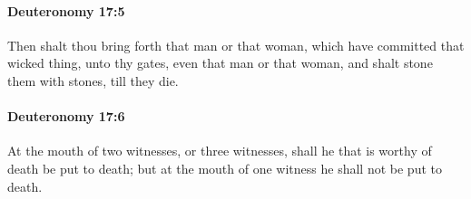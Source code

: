 		\paragraph{Deuteronomy 17:5} %
			\label{DEUTERONOMY-17-5}

			Then shalt thou bring forth that man or that woman, which have committed that wicked thing, unto thy gates, even that man or that woman, and shalt stone them with stones, till they die.


		\paragraph{Deuteronomy 17:6} %
			\label{DEUTERONOMY-17-6}

			At the mouth of two witnesses, or three witnesses, shall he that is worthy of death be put to death; but at the mouth of one witness he shall not be put to death.

